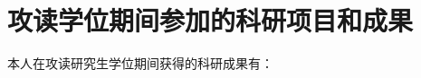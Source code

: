 \documentclass{ZUST_Thesis}
\begin{document}
\newpage
\pagestyle{achievement}
\section*{攻读学位期间参加的科研项目和成果}

本人在攻读研究生学位期间获得的科研成果有：




\end{document}
